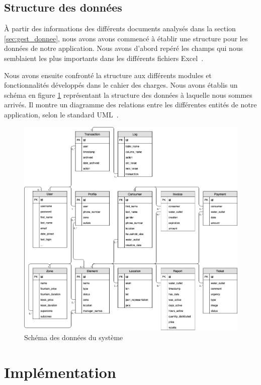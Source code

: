 \documentclass{EPL-master-thesis-covers-FR}
\begin{document}
		\section{Structure des données}
			\label{sec:data}

			À partir des informations des différents documents analysés dans la section \ref{sec:gest_donnee}, nous avons avons commencé à établir une structure pour les données de notre application. Nous avons d'abord repéré les champs qui nous semblaient les plus importants dans les différents fichiers Excel~\cite{ref:resumes_documents}.

			Nous avons ensuite confronté la structure aux différents modules et fonctionnalités développés dans le cahier des charges. Nous avons établis un schéma en figure \ref{fig:db} représentant la structure des données à laquelle nous sommes arrivés. Il montre un diagramme des relations entre les différentes entités de notre application, selon le standard UML~\cite{ref:siegfried_db}.

			\begin{figure}
				\centering
				\includegraphics[width=\textwidth]{images/db}
				\caption{Schéma des données du système}
				\label{fig:db}
			\end{figure}

	\chapter{Implémentation}
\end{document}
